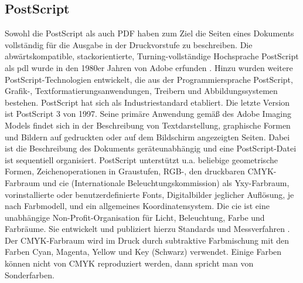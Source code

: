\subsection{PostScript}
Sowohl die PostScript als auch PDF haben zum Ziel die Seiten eines Dokuments vollständig für die Ausgabe in der Druckvorstufe zu beschreiben. Die abwärtskompatible, stackorientierte, Turning-vollständige Hochsprache PostScript als \gls{pdl} wurde in den 1980er Jahren von Adobe erfunden \cite{adobe-postscript, wiki-postscript}. Hinzu wurden weitere PostScript-Technologien entwickelt, die aus der Programmiersprache PostScript, Grafik-, Textformatierungsanwendungen, Treibern und Abbildungssystemen bestehen. PostScript hat sich als Industriestandard etabliert. Die letzte Version ist PostScript 3 von 1997. Seine primäre Anwendung gemäß des Adobe Imaging Models findet sich in der Beschreibung von Textdarstellung, graphische Formen und Bildern auf gedruckten oder auf dem Bildschirm angezeigten Seiten. Dabei ist die Beschreibung des Dokuments geräteunabhängig und eine PostScript-Datei ist sequentiell organisiert. PostScript unterstützt u.a. beliebige geometrische Formen, Zeichenoperationen in Graustufen, RGB-, den druckbaren CMYK-Farbraum und \gls{cie} (Internationale Beleuchtungskommission) als Yxy-Farbraum, vorinstallierte oder benutzerdefinierte Fonts, Digitalbilder jeglicher Auflösung, je nach Farbmodell, und ein allgemeines Koordinatensystem. Die \gls{cie} ist eine unabhängige Non-Profit-Organisation für Licht, Beleuchtung, Farbe und Farbräume. Sie entwickelt und publiziert hierzu Standards und Messverfahren \cite{wiki-cie-de, wiki-cie-engl}. Der CMYK-Farbraum wird im Druck durch subtraktive Farbmischung mit den Farben Cyan, Magenta, Yellow und Key (Schwarz) verwendet. Einige Farben können nicht von CMYK reproduziert werden, dann spricht man von Sonderfarben.
\par
